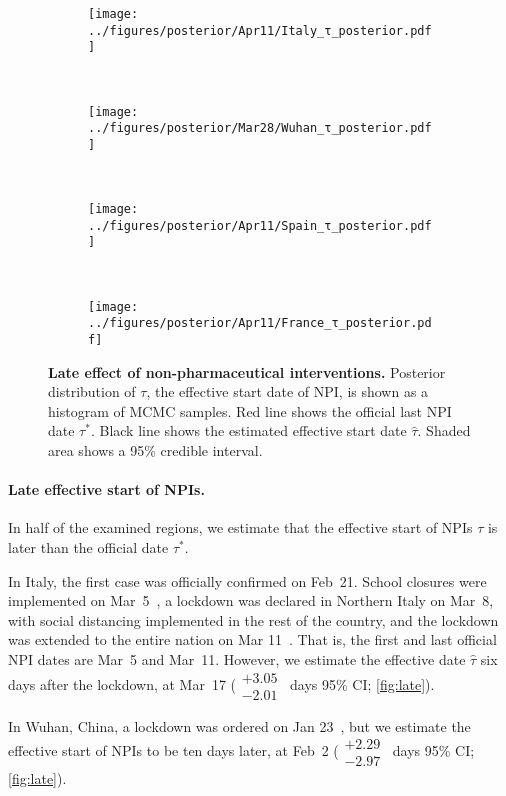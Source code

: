 \documentclass[12pt]{extarticle}
\begin{document}
\begin{figure}[h]
    \centering
    \begin{subfigure}{0.45\textwidth}
        \texttt{[image: ../figures/posterior/Apr11/Italy\_τ\_posterior.pdf]}
    \end{subfigure}
  	~
    \begin{subfigure}{0.45\textwidth}
        \texttt{[image: ../figures/posterior/Mar28/Wuhan\_τ\_posterior.pdf]}
    \end{subfigure}
    \\
    \begin{subfigure}{0.45\textwidth}
        \texttt{[image: ../figures/posterior/Apr11/Spain\_τ\_posterior.pdf]}
    \end{subfigure}
    ~
    \begin{subfigure}{0.45\textwidth}
		\texttt{[image: ../figures/posterior/Apr11/France\_τ\_posterior.pdf]}
    \end{subfigure}
    \caption{
	\textbf{Late effect of non-pharmaceutical interventions.}
    Posterior distribution of $\tau$, the effective start date of NPI, is shown as a histogram of MCMC samples. Red line shows the official last NPI date $\tau^*$. Black line shows the estimated effective start date $\hat{\tau}$. Shaded area shows a 95\% credible interval. 
    }
    \label{fig:late}
\end{figure}



\paragraph*{Late effective start of NPIs.}
In half of the examined regions, we estimate that the effective start of NPIs $\tau$ is later than the official date $\tau^*$.
 
In Italy, the first case was officially confirmed on Feb~21. School closures were implemented on Mar~5~\citep{Flaxman2020}, a lockdown was declared in Northern Italy on Mar~8, with social distancing implemented in the rest of the country, and the lockdown was extended to the entire nation on Mar 11~\citep{Gatto2020}.
That is, the first and last official NPI dates are Mar~5 and Mar~11.
However, we estimate the effective date $\hat{\tau}$ six days after the lockdown, at Mar~17 ($\substack{+3.05 \\ -2.01}$~days 95\% CI; \autoref{fig:late}). 

In Wuhan, China, a lockdown was ordered on Jan 23~\citep{Li2020}, but we estimate the effective start of NPIs to be ten days later, at Feb~2 ($\substack{+2.29 \\ -2.97}$~days 95\% CI; \autoref{fig:late}).
\end{document}
